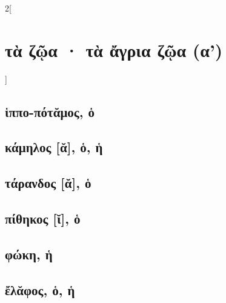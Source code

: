 \documentclass{book}
\begin{document}
\begin{multicols}{2}[\section{τὰ ζῷα · τὰ ἄγρια ζῷα (α')}]
\subsection{ἱππο-πότᾰμος, ὁ}
\subsection{κάμηλος [ᾰ], ὁ, ἡ}
\subsection{τάρανδος [ᾰ], ὁ}
\subsection{πίθηκος [ῐ], ὁ}
\subsection{φώκη, ἡ}
\subsection{ἔλᾰφος, ὁ, ἡ}
~
\end{multicols}
\newpage  
\end{document}
